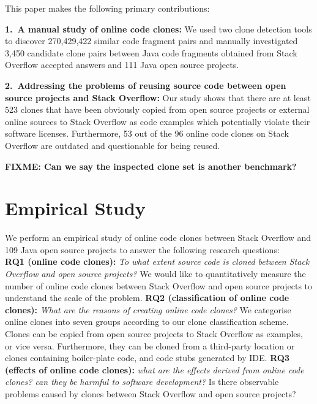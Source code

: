 \documentclass{sig-alternate-05-2015}
\newcommand\FIXME[1]{\textbf{FIXME: #1}}
\begin{document}
This paper makes the following  primary contributions:

\vspace{0.5ex}%
\noindent\textbf{1.~A manual study of online code clones:} 
We used two clone detection tools to discover 270,429,422 similar code fragment pairs and manually investigated 3,450 candidate clone pairs between Java code fragments obtained from Stack Overflow accepted answers and 111 Java open source projects.

\vspace{0.5ex}%
\noindent\textbf{2.~Addressing the problems of reusing source code between open source projects and Stack Overflow:} Our study shows that there are at least 523 clones that have been obviously copied from open source projects or external online sources to Stack Overflow as code examples which potentially violate their software licenses. Furthermore, 53 out of the 96 online code clones on Stack Overflow are outdated and questionable for being reused.

\FIXME{Can we say the inspected clone set is another benchmark?}

\section{Empirical Study}
We perform an empirical study of online code clones between Stack Overflow and 109 Java open source projects to answer the following research questions: \\ 
\textbf{RQ1 (online code clones):} \textit{To what extent  source code is cloned between Stack Overflow and open source projects?} We would like to quantitatively measure the number of online code clones between Stack Overflow and open source projects to understand the scale of the problem. \newline
\textbf{RQ2 (classification of online code clones):} \textit{What are the reasons of creating online code clones?} We categorise online clones into seven groups according to our clone classification scheme. %
Clones can be copied from open source projects to Stack Overflow as examples, or vice versa. Furthermore, they can be cloned from a third-party location or clones containing boiler-plate code, and code stubs generated by IDE. \newline
\textbf{RQ3 (effects of online code clones):} \textit{what are the effects derived from online code clones? can they be harmful to software development?} Is there observable problems caused by clones between Stack Overflow and open source projects?
\end{document}
